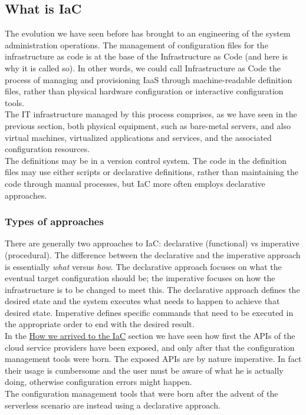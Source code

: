 \subsection{What is IaC}
The evolution we have seen before has brought to an engineering of the system administration operations.
The management of configuration files for the infrastructure as code is at the base of the Infrastructure as Code (and here is why it is called so).
In other words, we could call Infrastructure as Code the process of managing and provisioning \gls{IaaS} through machine-readable definition files, rather than physical hardware configuration or interactive configuration tools. \\
The IT infrastructure managed by this process comprises, as we have seen in the previous section, both physical equipment, such as bare-metal servers, and also virtual machines, virtualized applications and services, and the associated configuration resources. \\
The definitions may be in a version control system. The code in the definition files may use either scripts or declarative definitions, rather than maintaining the code through manual processes, but IaC more often employs declarative approaches.


\subsubsection{Types of approaches}

There are generally two approaches to IaC: declarative (functional) vs imperative (procedural). The difference between the declarative and the imperative approach is essentially \textit{what} versus \textit{how}.
The declarative approach focuses on what the eventual target configuration should be; the imperative focuses on how the infrastructure is to be changed to meet this.
The declarative approach defines the desired state and the system executes what needs to happen to achieve that desired state.
Imperative defines specific commands that need to be executed in the appropriate order to end with the desired result.\\
In the \hyperref[sec:story-iac]{How we arrived to the IaC} section we have seen how first the APIs of the cloud service providers have been exposed, and only after that the configuration management tools were born.
The exposed APIs are by nature imperative. In fact their usage is cumbersome and the user must be aware of what he is actually doing, otherwise configuration errors might happen.\\
The configuration management tools that were born after the advent of the serverless scenario are instead using a declarative approach.

